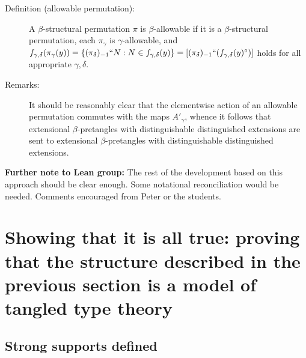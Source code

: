 \documentclass[112pt]{article}
\begin{document}
\begin{description}
\item[Definition (allowable permutation):]  A $\beta$-structural permutation $\pi$ is $\beta$-allowable if it is a $\beta$-structural permutation,
each $\pi_\gamma$ is $\gamma$-allowable, and $f_{\gamma,\delta}(\pi_\gamma(y)) = \{(\pi_\delta)_{-1}``N:N \in f_{\gamma,\delta}(y)\} = [(\pi_\delta)_{-1}``(f_{\gamma,\delta}(y)^\circ)]$ holds for all appropriate $\gamma, \delta$.

\item[Remarks:]  It should be reasonably clear that the elementwise action of an allowable permutation commutes with the maps $A'_\gamma$, whence it follows that extensional $\beta$-pretangles with distinguishable distinguished extensions are sent to extensional $\beta$-pretangles with distinguishable distinguished extensions.

\end{description}

{\bf Further note to Lean group:}  The rest of the development based on this approach should be clear enough.  Some notational reconciliation would be needed.  Comments encouraged from Peter or the students.

\newpage

\section{Showing that it is all true:  proving that the structure described in the previous section is a model of tangled type theory}

\subsection{Strong supports defined}
\end{document}
